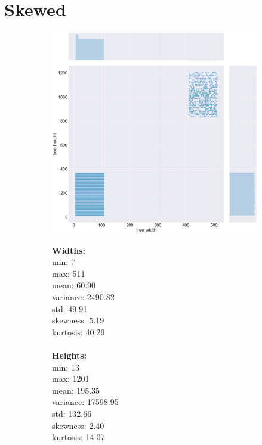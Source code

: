 \section{Skewed}
\label{appendix:data:skewed}
\begin{figure}[H]
\centering
\begin{subfigure}{.8\textwidth}
	\includegraphics[width=.9\textwidth]{img/4_SKEWED_plot.png}
\end{subfigure}%
\begin{subfigure}{.2\textwidth}
  \centering
  \begin{minipage}{1\textwidth}
\textbf{Widths:}
\\
min: 7
\\
max: 511
\\
mean: 60.90
\\
variance: 2490.82
\\
std: 49.91
\\
skewness: 5.19
\\
kurtosis: 40.29
\\\\
\textbf{Heights:}
\\
min: 13
\\
max: 1201
\\
mean: 195.35
\\
variance: 17598.95
\\
std: 132.66
\\
skewness: 2.40
\\
kurtosis: 14.07
  \end{minipage}
\end{subfigure}
\end{figure}
